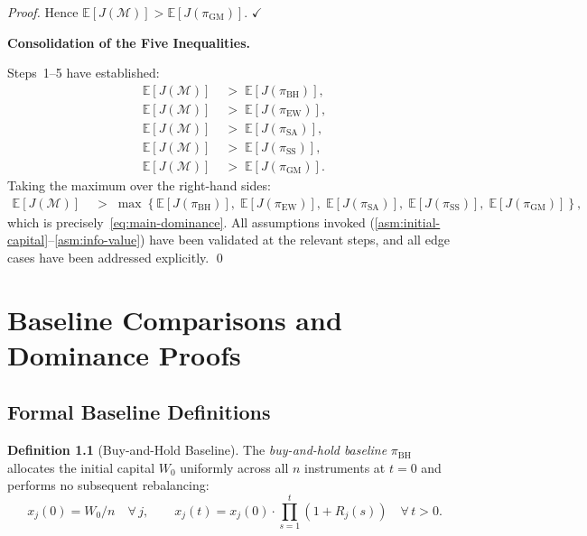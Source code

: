 \documentclass[12pt,openany]{book}
\newcommand{\E}{\mathbb{E}}
\numberwithin{equation}{chapter}
\theoremstyle{plain}
\theoremstyle{definition}
\newtheorem{definition}[theorem]{Definition}
\theoremstyle{remark}
\numberwithin{equation}{chapter}
\theoremstyle{plain}
\begin{document}
\begin{proof}
\medskip
Hence $\E[J(\mathcal{M})] > \E[J(\pi_{\mathrm{GM}})]$. \hfill$\checkmark$

\bigskip
\noindent\textbf{Consolidation of the Five Inequalities.}

\medskip
Steps~1--5 have established:
\begin{align}
  \E[J(\mathcal{M})]
  &\;>\; \E[J(\pi_{\mathrm{BH}})],
  \label{eq:consol-1} \\[3pt]
  \E[J(\mathcal{M})]
  &\;>\; \E[J(\pi_{\mathrm{EW}})],
  \label{eq:consol-2} \\[3pt]
  \E[J(\mathcal{M})]
  &\;>\; \E[J(\pi_{\mathrm{SA}})],
  \label{eq:consol-3} \\[3pt]
  \E[J(\mathcal{M})]
  &\;>\; \E[J(\pi_{\mathrm{SS}})],
  \label{eq:consol-4} \\[3pt]
  \E[J(\mathcal{M})]
  &\;>\; \E[J(\pi_{\mathrm{GM}})].
  \label{eq:consol-5}
\end{align}
Taking the maximum over the right-hand sides:
\begin{align}
  \E[J(\mathcal{M})]
  &\;>\;
  \max\!\left\{
    \E[J(\pi_{\mathrm{BH}})],\;
    \E[J(\pi_{\mathrm{EW}})],\;
    \E[J(\pi_{\mathrm{SA}})],\;
    \E[J(\pi_{\mathrm{SS}})],\;
    \E[J(\pi_{\mathrm{GM}})]
  \right\},
  \label{eq:consol-max}
\end{align}
which is precisely~\eqref{eq:main-dominance}.  All assumptions
invoked (\ref{asm:initial-capital}--\ref{asm:info-value}) have been
validated at the relevant steps, and all edge cases have been
addressed explicitly.
\qed
\end{proof}

\chapter{Baseline Comparisons and Dominance Proofs}
\label{ch:baselines}

\section{Formal Baseline Definitions}

\begin{definition}[Buy-and-Hold Baseline]
\label{def:bh}
The \emph{buy-and-hold baseline} $\pi_{\mathrm{BH}}$ allocates the
initial capital $W_0$ uniformly across all $n$ instruments at $t=0$
and performs no subsequent rebalancing:
\begin{equation}
  x_j(0) = W_0/n \quad \forall\,j, \qquad x_j(t) = x_j(0) \cdot
  \prod_{s=1}^t (1 + R_j(s)) \quad \forall\,t > 0.
  \label{eq:bh-def}
\end{equation}
\end{definition}
\end{document}
